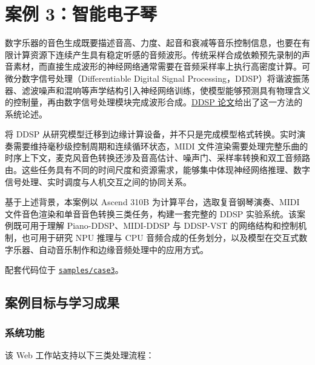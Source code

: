 \chapter{案例
3：智能电子琴}\label{ux6848ux4f8b-3ux667aux80fdux7535ux5b50ux7434}

数字乐器的音色生成既要描述音高、力度、起音和衰减等音乐控制信息，也要在有限计算资源下连续产生具有稳定听感的音频波形。传统采样合成依赖预先录制的声音素材，而直接生成波形的神经网络通常需要在音频采样率上执行高密度计算。可微分数字信号处理（Differentiable
Digital Signal
Processing，DDSP）将谐波振荡器、滤波噪声和混响等声学结构引入神经网络训练，使模型能够预测具有物理含义的控制量，再由数字信号处理模块完成波形合成。\href{https://arxiv.org/abs/2001.04643}{DDSP
论文}给出了这一方法的系统论述。

将 DDSP
从研究模型迁移到边缘计算设备，并不只是完成模型格式转换。实时演奏需要维持毫秒级控制周期和连续循环状态，MIDI
文件渲染需要处理完整乐曲的时序上下文，麦克风音色转换还涉及音高估计、噪声门、采样率转换和双工音频路由。这些任务具有不同的时间尺度和资源需求，能够集中体现神经网络推理、数字信号处理、实时调度与人机交互之间的协同关系。

基于上述背景，本案例以 Ascend 310B 为计算平台，选取复音钢琴演奏、MIDI
文件音色渲染和单音音色转换三类任务，构建一套完整的 DDSP
实验系统。该案例既可用于理解 Piano-DDSP、MIDI-DDSP 与 DDSP-VST
的网络结构和控制机制，也可用于研究 NPU 推理与 CPU
音频合成的任务划分，以及模型在交互式数字乐器、自动音乐制作和边缘音频处理中的应用方式。

配套代码位于
\href{https://github.com/zhouxzh/Ascend310/tree/main/samples/case3}{\passthrough{\lstinline!samples/case3!}}。

\section{案例目标与学习成果}\label{src-experiment-case3-overview}

\subsection{系统功能}\label{src-experiment-case3-capabilities}

该 Web 工作站支持以下三类处理流程：

